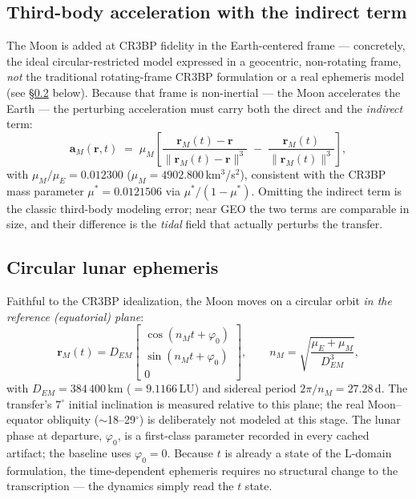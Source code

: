 \documentclass[11pt]{article}
\newcommand{\vect}[1]{\bm{#1}}
\begin{document}
\subsection{Third-body acceleration with the indirect term}

The Moon is added at CR3BP fidelity in the Earth-centered frame ---
concretely, the ideal circular-restricted model expressed in a geocentric,
non-rotating frame, \emph{not} the traditional rotating-frame CR3BP
formulation or a real ephemeris model (see \S\ref{sec:lunareph} below).
Because that frame is non-inertial --- the Moon accelerates the Earth --- the
perturbing acceleration must carry both the direct and the
\emph{indirect} term:
\begin{equation}
\label{eq:thirdbody}
\vect{a}_M(\vect{r}, t) \;=\; \mu_M \left[
\frac{\vect{r}_M(t) - \vect{r}}{\lVert \vect{r}_M(t) - \vect{r} \rVert^{3}}
\;-\;
\frac{\vect{r}_M(t)}{\lVert \vect{r}_M(t) \rVert^{3}}
\right],
\end{equation}
with $\mu_M/\mu_E = 0.012300$ ($\mu_M = 4902.800$\,km$^3$/s$^2$),
consistent with the CR3BP mass parameter
$\mu^\ast = 0.0121506$ via $\mu^\ast/(1-\mu^\ast)$. Omitting the indirect
term is the classic third-body modeling error; near GEO the two terms are
comparable in size, and their difference is the \emph{tidal} field that
actually perturbs the transfer.

\subsection{Circular lunar ephemeris}
\label{sec:lunareph}

Faithful to the CR3BP idealization, the Moon moves on a circular orbit
\emph{in the reference (equatorial) plane}:
\begin{equation}
\vect{r}_M(t) = D_{EM}
\begin{bmatrix} \cos(n_M t + \varphi_0)\\ \sin(n_M t + \varphi_0)\\ 0 \end{bmatrix},
\qquad
n_M = \sqrt{\frac{\mu_E + \mu_M}{D_{EM}^{3}}},
\end{equation}
with $D_{EM} = 384\,400$\,km ($= 9.1166$\,LU) and sidereal period
$2\pi/n_M = 27.28$\,d. The transfer's $7^\circ$ initial inclination is
measured relative to this plane; the real Moon--equator obliquity
($\sim$18--29$^\circ$) is deliberately not modeled at this stage. The lunar
phase at departure, $\varphi_0$, is a first-class parameter recorded in
every cached artifact; the baseline uses $\varphi_0 = 0$. Because $t$ is
already a state of the L-domain formulation, the time-dependent ephemeris
requires no structural change to the transcription --- the dynamics simply
read the $t$ state.
\end{document}
